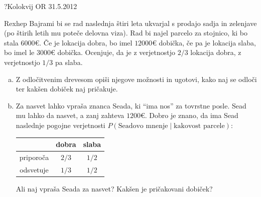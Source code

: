 \begin{naloga}{?}{Kolokvij OR 31.5.2012}
\begin{vprasanje}
Rexhep Bajrami bi se rad naslednja štiri leta
ukvarjal s prodajo sadja in zelenjave
(po štirih letih mu poteče delovna viza).
Rad bi najel parcelo za stojnico, ki bo stala $6000 €$.
Če je lokacija dobra, bo imel $12000 €$ dobička,
če pa je lokacija slaba, bo imel le $3000 €$ dobička.
Ocenjuje, da je z verjetnostjo $2/3$ lokacija dobra,
z verjetnostjo $1/3$ pa slaba.
\begin{enumerate}[(a)]
\item Z odločitvenim drevesom opiši njegove možnosti in ugotovi,
kako naj se odloči ter kakšen dobiček naj pričakuje.
\item Za nasvet lahko vpraša znanca Seada, ki ``ima nos'' za tovrstne posle.
Sead mu lahko da nasvet, a zanj zahteva $1200 €$.
Dobro je znano, da ima Sead naslednje pogojne verjetnosti
$P(\text{Seadovo mnenje} \; | \; \text{kakovost parcele})$:
\begin{center}
\begin{tabular}{c|cc}
& dobra & slaba \\
\hline
priporoča & $2/3$ & $1/2$ \\
odsvetuje & $1/3$ & $1/2$
\end{tabular}
\end{center}
Ali naj vpraša Seada za nasvet?
Kakšen je pričakovani dobiček?
\end{enumerate}
\end{vprasanje}
\begin{odgovor}
\end{odgovor}
\end{naloga}


